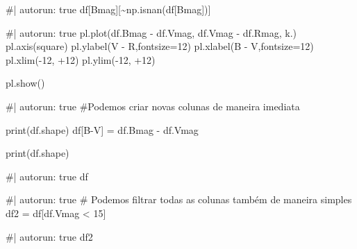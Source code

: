 \documentclass[
  letterpaper,
  DIV=11,
  numbers=noendperiod]{scrreprt}
\newenvironment{Shaded}{\begin{snugshade}}{\end{snugshade}}
\newcommand{\NormalTok}[1]{\textcolor[rgb]{0.00,0.23,0.31}{#1}}
\begin{document}
\begin{Shaded}
\begin{Highlighting}[]
\NormalTok{\#| autorun: true}
\NormalTok{df[\textquotesingle{}Bmag\textquotesingle{}][\textasciitilde{}np.isnan(df[\textquotesingle{}Bmag\textquotesingle{}])]}
\end{Highlighting}
\end{Shaded}

\begin{Shaded}
\begin{Highlighting}[]
\NormalTok{\#| autorun: true}
\NormalTok{pl.plot(df.Bmag {-} df.Vmag, df.Vmag {-} df.Rmag, \textquotesingle{}k.\textquotesingle{})}
\NormalTok{pl.axis(\textquotesingle{}square\textquotesingle{})}
\NormalTok{pl.ylabel(\textquotesingle{}V {-} R\textquotesingle{},fontsize=12)}
\NormalTok{pl.xlabel(\textquotesingle{}B {-} V\textquotesingle{},fontsize=12)}
\NormalTok{pl.xlim({-}12, +12)}
\NormalTok{pl.ylim({-}12, +12)}

\NormalTok{pl.show()}
\end{Highlighting}
\end{Shaded}

\begin{Shaded}
\begin{Highlighting}[]
\NormalTok{\#| autorun: true}
\NormalTok{\#Podemos criar novas colunas de maneira imediata}

\NormalTok{print(df.shape)}
\NormalTok{df[\textquotesingle{}B{-}V\textquotesingle{}] = df.Bmag {-} df.Vmag}

\NormalTok{print(df.shape)}
\end{Highlighting}
\end{Shaded}

\begin{Shaded}
\begin{Highlighting}[]
\NormalTok{\#| autorun: true}
\NormalTok{df}
\end{Highlighting}
\end{Shaded}

\begin{Shaded}
\begin{Highlighting}[]
\NormalTok{\#| autorun: true}
\NormalTok{\# Podemos filtrar todas as colunas também de maneira simples}
\NormalTok{df2 = df[df.Vmag \textless{} 15]}
\end{Highlighting}
\end{Shaded}

\begin{Shaded}
\begin{Highlighting}[]
\NormalTok{\#| autorun: true}
\NormalTok{df2}
\end{Highlighting}
\end{Shaded}
\end{document}
